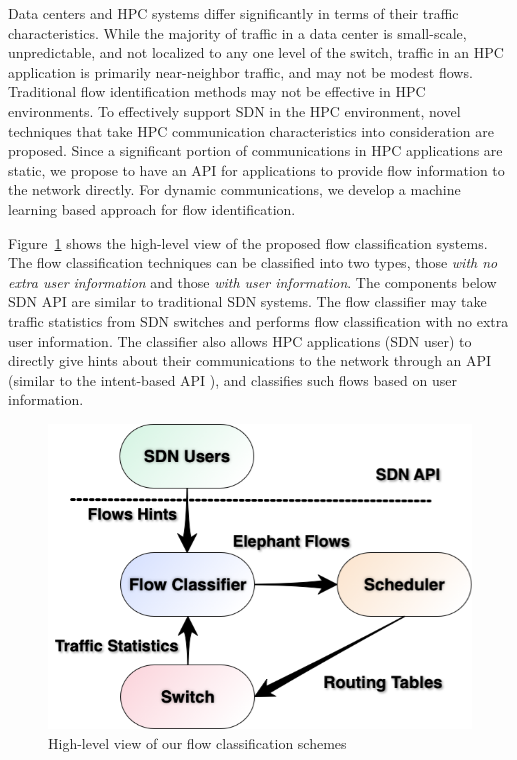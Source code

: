 Data centers and HPC systems differ significantly in terms of their traffic characteristics. While the majority of traffic in a data center is small-scale, unpredictable, and not localized to any one level of the switch, traffic in an HPC application is primarily near-neighbor traffic, and may not be modest flows. Traditional flow identification methods may not be effective
in HPC environments. To effectively support SDN in the HPC environment,
novel techniques that take HPC communication characteristics into
consideration are proposed. Since a significant portion of
communications in HPC applications are static, we propose to have an API for
applications to provide flow information to the network directly. For
dynamic communications, we develop a machine learning based approach for
flow identification.

Figure~\ref{fig:flow_schemes} shows the high-level view of the proposed
flow classification systems. The flow classification techniques can
be classified into two types, those {\em with no extra user information} and
those {\em with user information}. The components below SDN API are similar to
traditional SDN systems. The flow classifier may take traffic statistics from
SDN switches and performs flow classification with no extra user information.
The classifier also allows HPC applications (SDN user) to directly give
hints about their communications to the network through an API
(similar to the intent-based API \cite{Coflow2012}), and classifies
such flows based on user information.

\begin{figure}[h]
\centering
    \includegraphics[width=0.8\columnwidth]{figs/Fig3.png}
\caption{High-level view of our flow classification schemes}
  \label{fig:flow_schemes}
\end{figure}

